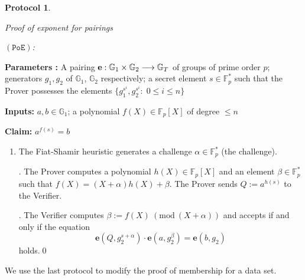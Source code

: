 \documentclass[a4paper, 11pt]{scrreprt}
\newtheorem{Prot}[Thm]{Protocol}
\numberwithin{equation}{section}
\newcommand{\bFp}{\mathbb{F}_p}
\newcommand{\ttt}{\texttt}
\newcommand{\lra}{\longrightarrow}
\newcommand{\mb}{\mathbb}
\newcommand{\al}{\alpha}
\newcommand{\be}{\beta}
\newcommand{\vs}{\vspace{-2mm}}
\newcommand{\noin}{\noindent}
\newcommand{\Mod}[1]{\ (\mathrm{mod}\ #1)}
\theoremstyle{plain}
\begin{document}
\begin{mdframed}\begin{Prot} \hypertarget{PoE}{ \textit{Proof of exponent for pairings}} $(\ttt{PoE})$:\end{Prot} 

\noindent \textbf{Parameters :} A pairing ${\bf{e}}: \mb{G}_1\times \mb{G}_2\lra \mb{G}_T$ of groups of prime order $p$; generators $g_1, g_2$ of $\mb{G}_1$, $\mb{G}_2$ respectively; a secret element $s\in \bFp^*$ such that the Prover possesses the elements $\{g_1^{s^i}, g_2^{s^i}:\; 0\leq i\leq n \}$ 

\noindent \textbf{Inputs:} $a,b\in \mb{G}_1$; a polynomial $f(X)\in \bFp[X]$ of degree $\leq n$

\noindent \textbf{Claim:} $a^{f(s)} = b$

\begin{enumerate}[wide, labelwidth=!, labelindent=0pt] \vs \item The Fiat-Shamir heuristic generates a challenge $\al\in \bFp^*$ (the challenge).

. The Prover computes a polynomial $h(X)\in  \bFp[X]$ and an element $\be\in \bFp^*$ such that $f(X) = (X+\al)h(X)+ \be$. The Prover sends $Q:= a^{h(s)}$ to the Verifier.

. The Verifier computes $\be:= f(X)\Mod{(X+\al)}$ and accepts if and only if the equation \vs $$\mathbf{e}(Q, g_2^{s+\al})\cdot\mathbf{e}(a, g_2^{\be})  = \mathbf{e}(b, g_2)$$ holds.\qed \end{enumerate}\end{mdframed}


\bigskip


\noin We use the last protocol to modify the proof of membership for a data set.
\end{document}
